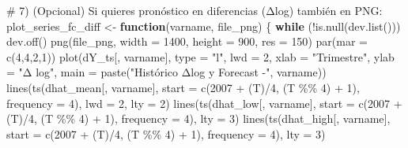 \documentclass[
  spanish,
  letterpaper,
  DIV=11,
  numbers=noendperiod]{scrartcl}
\newenvironment{Shaded}{\begin{snugshade}}{\end{snugshade}}
\newcommand{\AttributeTok}[1]{\textcolor[rgb]{0.40,0.45,0.13}{#1}}
\newcommand{\CommentTok}[1]{\textcolor[rgb]{0.37,0.37,0.37}{#1}}
\newcommand{\ControlFlowTok}[1]{\textcolor[rgb]{0.00,0.23,0.31}{\textbf{#1}}}
\newcommand{\DecValTok}[1]{\textcolor[rgb]{0.68,0.00,0.00}{#1}}
\newcommand{\FunctionTok}[1]{\textcolor[rgb]{0.28,0.35,0.67}{#1}}
\newcommand{\NormalTok}[1]{\textcolor[rgb]{0.00,0.23,0.31}{#1}}
\newcommand{\OtherTok}[1]{\textcolor[rgb]{0.00,0.23,0.31}{#1}}
\newcommand{\SpecialCharTok}[1]{\textcolor[rgb]{0.37,0.37,0.37}{#1}}
\newcommand{\StringTok}[1]{\textcolor[rgb]{0.13,0.47,0.30}{#1}}
\begin{document}
\begin{Shaded}
\begin{Highlighting}[]
\CommentTok{\# 7) (Opcional) Si quieres pronóstico en diferencias (Δlog) también en PNG:}
\NormalTok{plot\_series\_fc\_diff }\OtherTok{\textless{}{-}} \ControlFlowTok{function}\NormalTok{(varname, file\_png) \{}
  \ControlFlowTok{while}\NormalTok{ (}\SpecialCharTok{!}\FunctionTok{is.null}\NormalTok{(}\FunctionTok{dev.list}\NormalTok{())) }\FunctionTok{dev.off}\NormalTok{()}
  \FunctionTok{png}\NormalTok{(file\_png, }\AttributeTok{width =} \DecValTok{1400}\NormalTok{, }\AttributeTok{height =} \DecValTok{900}\NormalTok{, }\AttributeTok{res =} \DecValTok{150}\NormalTok{)}
  \FunctionTok{par}\NormalTok{(}\AttributeTok{mar =} \FunctionTok{c}\NormalTok{(}\DecValTok{4}\NormalTok{,}\DecValTok{4}\NormalTok{,}\DecValTok{2}\NormalTok{,}\DecValTok{1}\NormalTok{))}
  \FunctionTok{plot}\NormalTok{(dY\_ts[, varname], }\AttributeTok{type =} \StringTok{"l"}\NormalTok{, }\AttributeTok{lwd =} \DecValTok{2}\NormalTok{, }\AttributeTok{xlab =} \StringTok{"Trimestre"}\NormalTok{, }\AttributeTok{ylab =} \StringTok{"Δ log"}\NormalTok{,}
       \AttributeTok{main =} \FunctionTok{paste}\NormalTok{(}\StringTok{"Histórico Δlog y Forecast {-}"}\NormalTok{, varname))}
  \FunctionTok{lines}\NormalTok{(}\FunctionTok{ts}\NormalTok{(dhat\_mean[, varname],}
           \AttributeTok{start =} \FunctionTok{c}\NormalTok{(}\DecValTok{2007} \SpecialCharTok{+}\NormalTok{ (T)}\SpecialCharTok{/}\DecValTok{4}\NormalTok{, (T }\SpecialCharTok{\%\%} \DecValTok{4}\NormalTok{) }\SpecialCharTok{+} \DecValTok{1}\NormalTok{), }\AttributeTok{frequency =} \DecValTok{4}\NormalTok{), }\AttributeTok{lwd =} \DecValTok{2}\NormalTok{, }\AttributeTok{lty =} \DecValTok{2}\NormalTok{)}
  \FunctionTok{lines}\NormalTok{(}\FunctionTok{ts}\NormalTok{(dhat\_low[, varname],}
           \AttributeTok{start =} \FunctionTok{c}\NormalTok{(}\DecValTok{2007} \SpecialCharTok{+}\NormalTok{ (T)}\SpecialCharTok{/}\DecValTok{4}\NormalTok{, (T }\SpecialCharTok{\%\%} \DecValTok{4}\NormalTok{) }\SpecialCharTok{+} \DecValTok{1}\NormalTok{), }\AttributeTok{frequency =} \DecValTok{4}\NormalTok{), }\AttributeTok{lty =} \DecValTok{3}\NormalTok{)}
  \FunctionTok{lines}\NormalTok{(}\FunctionTok{ts}\NormalTok{(dhat\_high[, varname],}
           \AttributeTok{start =} \FunctionTok{c}\NormalTok{(}\DecValTok{2007} \SpecialCharTok{+}\NormalTok{ (T)}\SpecialCharTok{/}\DecValTok{4}\NormalTok{, (T }\SpecialCharTok{\%\%} \DecValTok{4}\NormalTok{) }\SpecialCharTok{+} \DecValTok{1}\NormalTok{), }\AttributeTok{frequency =} \DecValTok{4}\NormalTok{), }\AttributeTok{lty =} \DecValTok{3}\NormalTok{)}

\end{Highlighting}
\end{Shaded}
\end{document}
